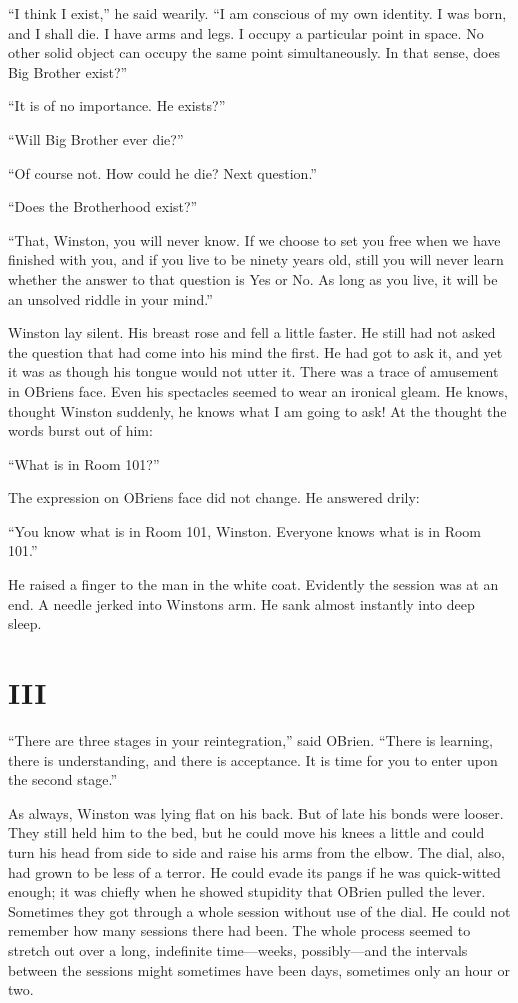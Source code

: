 ``I think I exist,'' he said wearily. ``I am conscious of my own identity.
I was born, and I shall die. I have arms and legs. I occupy a particular
point in space. No other solid object can occupy the same point
simultaneously. In that sense, does Big Brother exist?''

``It is of no importance. He exists?''

``Will Big Brother ever die?''

``Of course not. How could he die? Next question.''

``Does the Brotherhood exist?''

``That, Winston, you will never know. If we choose to set you free when
we have finished with you, and if you live to be ninety years old, still
you will never learn whether the answer to that question is Yes or No.
As long as you live, it will be an unsolved riddle in your mind.''

Winston lay silent. His breast rose and fell a little faster. He still
had not asked the question that had come into his mind the first. He had
got to ask it, and yet it was as though his tongue would not utter it.
There was a trace of amusement in
O\textquotesingle Brien\textquotesingle s face. Even his spectacles
seemed to wear an ironical gleam. He knows, thought Winston suddenly, he
knows what I am going to ask! At the thought the words burst out of him:

``What is in Room 101?''

The expression on O\textquotesingle Brien\textquotesingle s face did not
change. He answered drily:

``You know what is in Room 101, Winston. Everyone knows what is in Room
101.''

He raised a finger to the man in the white coat. Evidently the session
was at an end. A needle jerked into Winston\textquotesingle s arm. He
sank almost instantly into deep sleep.


\section{III}\label{iii-2}

``There are three stages in your reintegration,'' said
O\textquotesingle Brien. ``There is learning, there is understanding, and
there is acceptance. It is time for you to enter upon the second stage.''

As always, Winston was lying flat on his back. But of late his bonds
were looser. They still held him to the bed, but he could move his knees
a little and could turn his head from side to side and raise his arms
from the elbow. The dial, also, had grown to be less of a terror. He
could evade its pangs if he was quick-witted enough; it was chiefly when
he showed stupidity that O\textquotesingle Brien pulled the lever.
Sometimes they got through a whole session without use of the dial. He
could not remember how many sessions there had been. The whole process
seemed to stretch out over a long, indefinite time---weeks,
possibly---and the intervals between the sessions might sometimes have
been days, sometimes only an hour or two.

